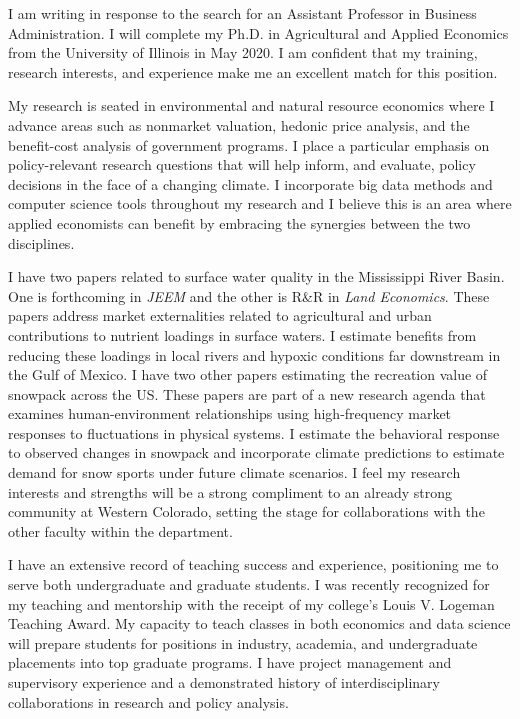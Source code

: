 \documentclass[12pt,sigleft,stdletternofrom]{newlfm} %
\begin{document}
\begin{newlfm}
\RaggedRight


I am writing in response to the search for an Assistant Professor in Business Administration. I will complete my Ph.D. in Agricultural and Applied Economics from the University of Illinois in May 2020. I am confident that my training, research interests, and experience make me an excellent match for this position.

My research is seated in environmental and natural resource economics where I advance areas such as nonmarket valuation, hedonic price analysis, and the benefit-cost analysis of government programs. I place a particular emphasis on policy-relevant research questions that will help inform, and evaluate, policy decisions in the face of a changing climate. I incorporate big data methods and computer science tools throughout my research and I believe this is an area where applied economists can benefit by embracing the synergies between the two disciplines. 

I have two papers related to surface water quality in the Mississippi River Basin. One is forthcoming in \textit{JEEM} and the other is R\&R in \textit{Land Economics}. These papers address market externalities related to agricultural and urban contributions to nutrient loadings in surface waters. I estimate benefits from reducing these loadings in local rivers and hypoxic conditions far downstream in the Gulf of Mexico. I have two other papers estimating the recreation value of snowpack across the US. These papers are part of a new research agenda that examines human-environment relationships using high-frequency market responses to fluctuations in physical systems. I estimate the behavioral response to observed changes in snowpack and incorporate climate predictions to estimate demand for snow sports under future climate scenarios. I feel my research interests and strengths will be a strong compliment to an already strong community at 
Western Colorado,  %
setting the stage for collaborations with the other faculty within the department. 

I have an extensive record of teaching success and experience, positioning me to serve both undergraduate and graduate students. I was recently recognized for my teaching and mentorship with the receipt of my college's Louis V. Logeman Teaching Award. My capacity to teach classes in both economics and data science will prepare students for positions in industry, academia, and undergraduate placements into top graduate programs. I have project management and supervisory experience and a demonstrated history of interdisciplinary collaborations in research and policy analysis. 


\end{newlfm}
\end{document}
